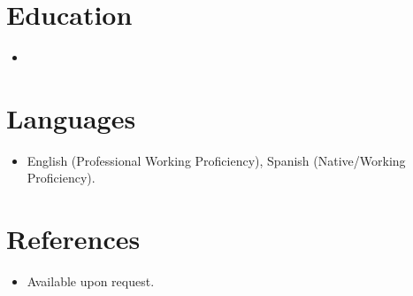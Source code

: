 \documentclass[11pt,a4paper,sans]{moderncv}
\begin{document}
\section{Education}
\vspace{1pt}
\begin{itemize}

\item{}

\end{itemize}


\section{Languages}
\vspace{1pt}
\begin{itemize}
\item English (Professional Working Proficiency), Spanish (Native/Working Proficiency).
\end{itemize}


\section{References}
\vspace{1pt}
\begin{itemize}
\item{Available upon request.}
\end{itemize}
\end{document}
